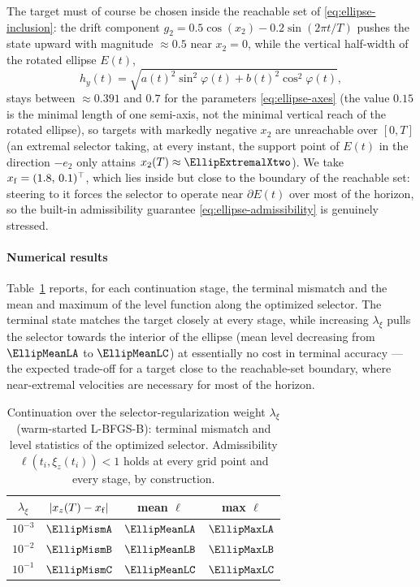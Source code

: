 \documentclass[11pt]{elsarticle}
\theoremstyle{definition}
\theoremstyle{remark}
\numberwithin{equation}{section}
\begin{document}
The target must of course be chosen inside the reachable set of
\eqref{eq:ellipse-inclusion}: the drift component
$g_2=0.5\cos(x_2)-0.2\sin(2\pi t/T)$ pushes the state upward with
magnitude $\approx0.5$ near $x_2=0$, while the vertical half-width of the
rotated ellipse $E(t)$,
\[
h_y(t)=\sqrt{a(t)^2\sin^2\varphi(t)+b(t)^2\cos^2\varphi(t)},
\]
stays between $\approx0.391$ and $0.7$ for the parameters
\eqref{eq:ellipse-axes} (the value $0.15$ is the minimal length of one
semi-axis, not the minimal vertical reach of the rotated ellipse), so
targets with markedly negative
$x_2$ are unreachable over $[0,T]$ (an extremal selector taking, at
every instant, the support point of $E(t)$ in the direction $-e_2$ only
attains $x_2(T)\approx\EllipExtremalXtwo$). We take
$x_{\rm f}=(1.8,\,0.1)^{\top}$, which lies inside but close to the
boundary of the reachable set: steering to it forces the selector to
operate near $\partial E(t)$ over most of the horizon, so the built-in
admissibility guarantee \eqref{eq:ellipse-admissibility} is genuinely
stressed.

\paragraph{Numerical results}
Table~\ref{tab:ellipse-continuation} reports, for each continuation
stage, the terminal mismatch and the mean and maximum of the level
function along the optimized selector. The terminal state matches the
target closely at every stage, while increasing
$\lambda_{\xi}$ pulls the selector towards the interior of
the ellipse (mean level decreasing from $\EllipMeanLA$ to $\EllipMeanLC$) at
essentially no cost in terminal accuracy --- the expected trade-off for
a target close to the reachable-set boundary, where near-extremal
velocities are necessary for most of the horizon.

\begin{table}[htbp]
	\centering
	\begin{tabular}{cccc}
		\toprule
		$\lambda_{\xi}$ & $|x_z(T)-x_{\rm f}|$ & mean $\ell$ & max $\ell$ \\
		\midrule
		$10^{-3}$ & $\EllipMismA$ & $\EllipMeanLA$ & $\EllipMaxLA$ \\
		$10^{-2}$ & $\EllipMismB$ & $\EllipMeanLB$ & $\EllipMaxLB$ \\
		$10^{-1}$ & $\EllipMismC$ & $\EllipMeanLC$ & $\EllipMaxLC$ \\
		\bottomrule
	\end{tabular}
	\caption{Continuation over the selector-regularization weight
		$\lambda_{\xi}$ (warm-started L-BFGS-B): terminal mismatch and level
		statistics of the optimized selector. Admissibility
		$\ell(t_i,\xi_z(t_i))<1$ holds at every grid point and every stage, by
		construction.}
	\label{tab:ellipse-continuation}
\end{table}
\end{document}
